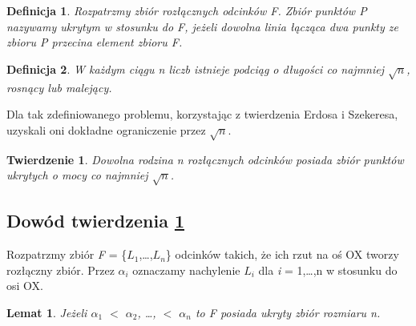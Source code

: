 \documentclass[brudnopis]{xmgr}
\newtheorem{Twierdzenie}{Twierdzenie}
\newtheorem{Lemat}{Lemat}
\newtheorem{Definicja}{Definicja}
\begin{document}
\begin{Definicja}\label{ukrywanie definicja}
 Rozpatrzmy zbiór rozłącznych odcinków F. Zbiór punktów P nazywamy ukrytym w stosunku do F, jeżeli dowolna linia łącząca dwa punkty ze zbioru P przecina element zbioru F.
\end{Definicja}

\begin{Definicja}\label{podciag rosnacy}
  W każdym ciągu n liczb istnieje podciąg o długości co najmniej $\sqrt{n}$, rosnący lub malejący.
\end{Definicja}

Dla tak zdefiniowanego problemu, korzystając z twierdzenia Erdosa i Szekeresa, uzyskali oni dokładne ograniczenie przez $\sqrt{n}$.
\begin{Twierdzenie}\label{moc zbioru ukrytego tw}
  Dowolna rodzina n rozłącznych odcinków posiada zbiór punktów ukrytych o mocy co najmniej $\sqrt{n}$.
\end{Twierdzenie}

\subsection{Dowód twierdzenia \ref{moc zbioru ukrytego tw}}
Rozpatrzmy zbiór \textit{F} = \{$L_1$,\ldots,$L_n$\} odcinków takich, że ich rzut na oś OX tworzy rozłączny zbiór. Przez $\alpha_i$ oznaczamy nachylenie $L_i$ dla \textit{i} = 1,\ldots,n w stosunku do osi OX.

\begin{Lemat}\label{zbior ukryty}
  Jeżeli $\alpha_1$ $<$ $\alpha_2$, \ldots, $<$ $\alpha_n$ to F posiada ukryty zbiór rozmiaru n.
\end{Lemat}
\end{document}

